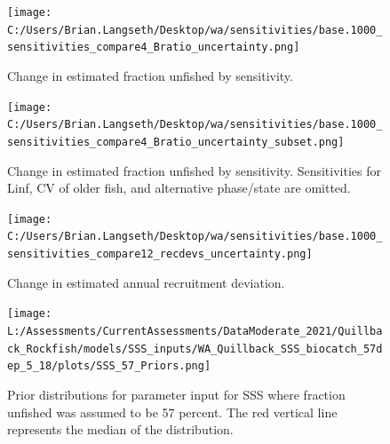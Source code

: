 \documentclass[11pt,
  english,
  a4paper,
]{article}
\begin{document}
\tagmcend\tagstructend


\begin{figure}
\centering
\texttt{[image: C:/Users/Brian.Langseth/Desktop/wa/sensitivities/base.1000\_sensitivities\_compare4\_Bratio\_uncertainty.png]}
\caption{Change in estimated fraction unfished by sensitivity.\label{fig:sens-depl}}
\end{figure}

\tagmcend\tagstructend


\begin{figure}
\centering
\texttt{[image: C:/Users/Brian.Langseth/Desktop/wa/sensitivities/base.1000\_sensitivities\_compare4\_Bratio\_uncertainty\_subset.png]}
\caption{Change in estimated fraction unfished by sensitivity. Sensitivities for Linf, CV of older fish, and alternative phase/state are omitted.\label{fig:sens-depl-subset}}
\end{figure}

\tagmcend\tagstructend


\begin{figure}
\centering
\texttt{[image: C:/Users/Brian.Langseth/Desktop/wa/sensitivities/base.1000\_sensitivities\_compare12\_recdevs\_uncertainty.png]}
\caption{Change in estimated annual recruitment deviation.\label{fig:sens-recdev}}
\end{figure}

\tagmcend\tagstructend


\begin{figure}
\centering
\texttt{[image: L:/Assessments/CurrentAssessments/DataModerate\_2021/Quillback\_Rockfish/models/SSS\_inputs/WA\_Quillback\_SSS\_biocatch\_57dep\_5\_18/plots/SSS\_57\_Priors.png]}
\caption{Prior distributions for parameter input for SSS where fraction unfished was assumed to be 57 percent. The red vertical line represents the median of the distribution.\label{fig:sss-prior-57}}
\end{figure}
\end{document}

